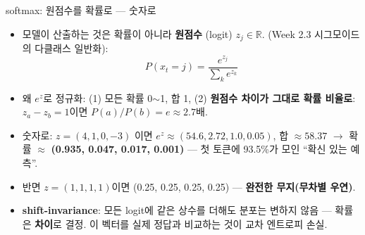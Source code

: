 \begin{frame}{softmax: 원점수를 확률로 --- 숫자로}
  \begin{itemize}
    \item 모델이 산출하는 것은 확률이 아니라 \textbf{원점수}
      (logit) $z_j \in \mathbb{R}$. (Week 2.3
      시그모이드의 다클래스 일반화):
      \[P(x_t = j) = \frac{e^{z_j}}{\sum_{k} e^{z_k}}\]
    \item 왜 $e^{z}$로 정규화: (1) 모든 확률 0$\sim$1, 합 1,
      (2) \textbf{원점수 차이가 그대로 확률 비율로}:
      $z_a - z_b = 1$이면 $P(a)/P(b) = e \approx 2.7$배.
    \item 숫자로: $z = (4, 1, 0, -3)$ 이면
      $e^z \approx (54.6, 2.72, 1.0, 0.05)$, 합 $\approx 58.37$
      $\to$ 확률 $\approx$ \textbf{(0.935, 0.047, 0.017, 0.001)}
      — 첫 토큰에 93.5\%가 모인 ``확신 있는 예측''.
    \item 반면 $z = (1,1,1,1)$이면 (0.25, 0.25, 0.25, 0.25) —
      \textbf{완전한 무지(무차별 우연)}.
    \item \textbf{shift-invariance}: 모든 logit에 같은 상수를
      더해도 분포는 변하지 않음 — 확률은 \textbf{차이}로
      결정. 이 벡터를 실제 정답과 비교하는 것이 교차
      엔트로피 손실.
  \end{itemize}
\end{frame}
